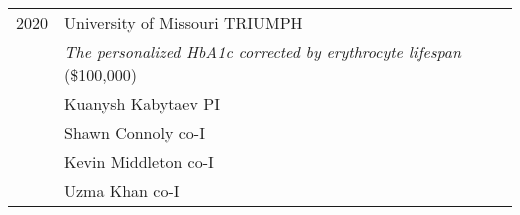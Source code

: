 \begin{longtable}{@{}lX@{}}
    2020 & University of Missouri TRIUMPH\\
         & \emph{The personalized HbA1c corrected by erythrocyte lifespan} (\$100,000)\\
         & Kuanysh Kabytaev PI\\
         & Shawn Connoly co-I\\
         & Kevin Middleton co-I\\
         & Uzma Khan co-I\\[0.5pc]
\end{longtable}
